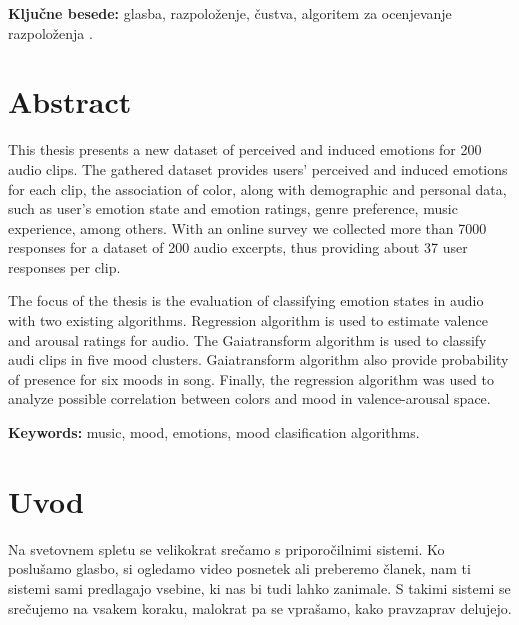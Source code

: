 \documentclass[a4paper, 12pt]{book}
\newcommand{\tkeywords}{glasba, razpoloženje, čustva, algoritem za ocenjevanje razpoloženja }
\newcommand{\tkeywordsEn}{music, mood, emotions,  mood clasification algorithms}
\newcommand{\clearemptydoublepage}{\newpage{\pagestyle{empty}\cleardoublepage}}
\begin{document}
{\bigskip

\noindent\textbf{Ključne besede:} \tkeywords.
\clearemptydoublepage

\chapter*{Abstract}

This thesis presents a new dataset of perceived and induced emotions for 200 audio clips. The gathered dataset provides users' perceived and induced emotions for each clip, the association of color, along with demographic and personal data, such as user's emotion state and emotion ratings, genre preference, music experience, among others. With an online survey we collected more than 7000 responses for a dataset of 200 audio excerpts, thus providing about 37 user responses per clip.

The focus of the thesis is the evaluation of classifying emotion states in audio with two existing algorithms.  Regression algorithm is used to estimate valence and arousal ratings for audio. The Gaiatransform algorithm is used to classify audi clips in five mood clusters. Gaiatransform algorithm also provide probability of presence for six moods in song. Finally, the regression algorithm was used to analyze possible correlation between colors and mood in valence-arousal space.

 

\bigskip

\noindent\textbf{Keywords:} \tkeywordsEn.
\clearemptydoublepage

\mainmatter
\setcounter{page}{1}
\pagestyle{fancy}


\chapter{Uvod}

Na svetovnem spletu se velikokrat srečamo s priporočilnimi sistemi. Ko poslušamo glasbo, si ogledamo video posnetek ali preberemo članek, nam ti sistemi sami predlagajo vsebine, ki nas bi tudi lahko zanimale. S takimi sistemi se srečujemo na vsakem koraku, malokrat pa se vprašamo, kako pravzaprav delujejo. 

}
\end{document}
